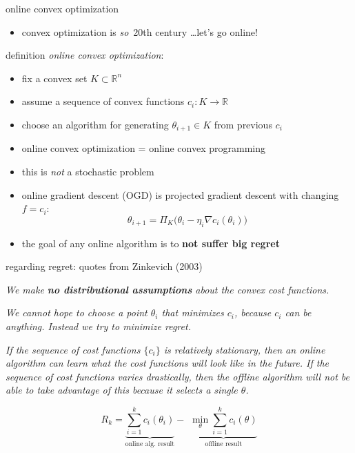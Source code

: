\documentclass[xcolor={svgnames},
               hyperref={colorlinks,citecolor=DeepPink4,linkcolor=FireBrick,urlcolor=Maroon}]
               {beamer}
\newcommand{\grad}{\nabla}
\newcommand{\RR}{\mathbb{R}}
\begin{document}
\begin{frame}{online convex optimization}

\begin{itemize}
\item convex optimization is \emph{so}\, 20th century \dots let's go online!
\end{itemize}

\begin{block}{definition}
\emph{online convex optimization}:

\begin{itemize}
\item fix a convex set $K\subset \RR^n$
\item assume a sequence of convex functions $c_i:K\to \RR$
\item choose an algorithm for generating $\theta_{i+1} \in K$ from previous $c_i$
\end{itemize}
\end{block}

\begin{itemize}
\item online convex optimization = online convex programming
\item this is \emph{not} a stochastic problem
\item online gradient descent (OGD) is projected gradient descent with changing $f=c_i$:
    $$\theta_{i+1} = \Pi_K \big(\theta_i - \eta_i \grad c_i(\theta_i)\big)$$
\item the goal of any online algorithm is to \textbf{not suffer big regret}
\end{itemize}
\end{frame}


\begin{frame}{regarding regret: quotes from Zinkevich (2003)}

\emph{We make \textbf{no distributional assumptions} about the convex cost functions.}

\medskip
\noindent \emph{We cannot hope to choose a point $\theta_i$ that minimizes $c_i$, because $c_i$ can be anything. Instead we try to minimize regret.}

\medskip
\noindent \emph{If the sequence of cost functions $\{c_i\}$ is relatively stationary, then an online algorithm can learn what the cost functions will look like in the future.  If the sequence of cost functions varies drastically, then the offline algorithm will not be able to take advantage of this because it selects a single $\theta$.}

  $$R_k = \underbrace{\sum_{i=1}^k c_i(\theta_i)}_{\text{online alg.~result}} - \,\, \underbrace{\min_\theta \sum_{i=1}^k c_i(\theta)}_{\text{offline result}}$$
\end{frame}
\end{document}
